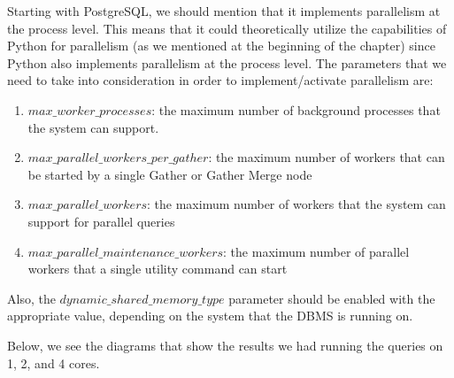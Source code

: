 Starting with PostgreSQL, we should mention that it implements parallelism at the process level. 
This means that it could theoretically utilize the capabilities of Python for parallelism (as we mentioned at the beginning of the chapter) 
since Python also implements parallelism at the process level. The parameters that we need to take into consideration in order to 
implement/activate parallelism are:
\begin{enumerate}
	\item $max\_worker\_processes$: the maximum number of background processes that the system can support.
	\item $max\_parallel\_workers\_per\_gather$: the maximum number of workers that can be started by a single Gather or Gather Merge node
	\item $max\_parallel\_workers$: the maximum number of workers that the system can support for parallel queries
	\item $max\_parallel\_maintenance\_workers$: the maximum number of parallel workers that a single utility command can start
\end{enumerate}
Also, the $dynamic\_shared\_memory\_type$ parameter should be enabled with the appropriate value, depending on the system that the DBMS is running on.

Below, we see the diagrams that show the results we had running the queries on 1, 2, and 4 cores.

